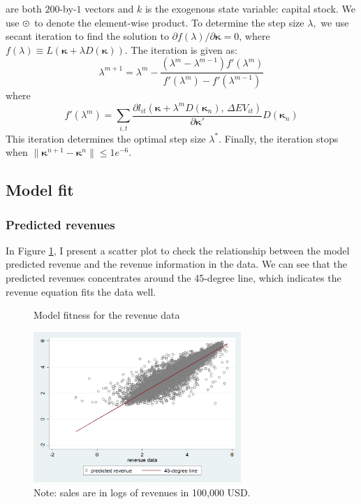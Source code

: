 \documentclass[11pt]{article}
\begin{document}
are both $200$-by-$1$ vectors and $k$ is the exogenous state variable:
capital stock. We use $\varodot$ to denote the element-wise product.
To determine the step size $\lambda,$ we use secant iteration to
find the solution to $\partial f\left(\lambda\right)/\partial\boldsymbol{\kappa}=0$,
where $f\left(\lambda\right)\equiv L\left(\boldsymbol{\kappa}+\lambda D\left(\boldsymbol{\kappa}\right)\right)$.
The iteration is given as:
\begin{equation}
\lambda^{m+1}=\lambda^{m}-\frac{\left(\lambda^{m}-\lambda^{m-1}\right)f'\left(\lambda^{m}\right)}{f'\left(\lambda^{m}\right)-f'\left(\lambda^{m-1}\right)}
\end{equation}
where 
\begin{equation}
f'\left(\lambda^{m}\right)=\sum_{i,t}\frac{\partial l_{it}\left(\boldsymbol{\kappa}+\lambda^{m}D\left(\boldsymbol{\kappa}_{n}\right),\,\Delta EV_{it}\right)}{\partial\boldsymbol{\kappa}'}D\left(\boldsymbol{\kappa}_{n}\right)
\end{equation}
This iteration determines the optimal step size $\lambda^{*}$. Finally,
the iteration stops when $\|\boldsymbol{\kappa}^{n+1}-\boldsymbol{\kappa}^{n}\|\leq 1e^{-6}$. 

\subsection{Model fit} \label{app_model_fit}
\subsubsection{Predicted revenues} In Figure \ref{F3}, I present a scatter plot to check the relationship between the model predicted revenue and the revenue information in the data. We can see that the predicted revenues concentrates around the 45-degree line, which indicates the revenue equation fits the data well. 

\begin{center}
\begin{figure}[h]
\caption{Model fitness for the revenue data}
\label{F3}
\begin{centering}
\includegraphics[width=0.7\textwidth]{Figs/revenue.png}
\par\end{centering}
\caption*{\small{}Note: sales are in logs of revenues in 100,000 USD.}{\small \par}
\end{figure}
\par\end{center}
\end{document}
